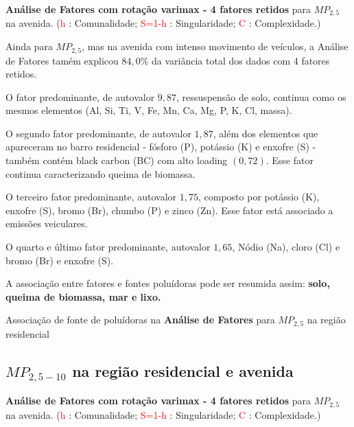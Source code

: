 \begin{table}[H]
  \caption{\textbf{Análise de Fatores com rotação varimax - 4 fatores retidos} 
             para $MP_{2,5}$ na avenida.
           (\textcolor{red}{h} : Comunalidade; 
           \textcolor{red}{S=1-h} : Singularidade; 
           \textcolor{red}{C} : Complexidade.)}
  
\end{table}

Ainda para $MP_{2,5}$, mas na avenida com intenso movimento de veículos,
a Análise de Fatores tamém explicou $84,0\%$ da variância total 
dos dados com 4 fatores retidos.

O fator predominante, de autovalor $9,87$, ressuspensão de solo, continua 
como os mesmos elementos (Al, Si, Ti, V, Fe, Mn, Ca, Mg, P, K, Cl, massa).

O segundo fator predominante, de autovalor $1,87$, além dos elementos que 
apareceram no barro residencial - fósforo (P), potássio (K) e enxofre (S) -
também contém black carbon (BC) com alto loading $(0,72)$. 
Esse fator continua caracterizando queima de biomassa.

O terceiro fator predominante, autovalor $1,75$, composto por
potássio (K), enxofre (S), bromo (Br), chumbo (P) e zinco (Zn). 
Esse fator está associado a emissões veiculares. 

O quarto e último fator predominante, autovalor $1,65$, 
Nódio (Na), cloro (Cl) e bromo (Br) e enxofre (S).



A associação entre fatores e fontes poluídoras pode ser resumida
assim: \textbf{solo, queima de biomassa, mar e lixo.}

\begin{table}[H]
  \centering
  \caption{Associação de fonte de poluídoras na \textbf{Análise de Fatores}
         para $MP_{2,5}$ na região residencial}
  
\end{table}

\subsection{$MP_{2,5-10}$ na região residencial e avenida}

\begin{table}[H]
  \caption{\textbf{Análise de Fatores com rotação varimax - 4 fatores retidos} 
             para $MP_{2,5}$ na avenida.
           (\textcolor{red}{h} : Comunalidade; 
           \textcolor{red}{S=1-h} : Singularidade; 
           \textcolor{red}{C} : Complexidade.)}
  
\end{table}

